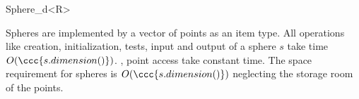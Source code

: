 \begin{ccRefClass}{Sphere_d<R>}




\ccImplementation

Spheres are implemented by a vector of points as
an item type.  All operations like creation, initialization, tests,
input and output of a sphere $s$ take time
$O(\ccc{s.dimension()})$. , point access take constant time.
The space requirement for spheres is $O(\ccc{s.dimension()})$ 
neglecting the storage room of the points. 



\end{ccRefClass}


